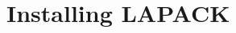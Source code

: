 \documentclass{article}
\begin{document}
% 



\clearpage






\clearpage






\clearpage
\section{Installing LAPACK}
\end{document}
